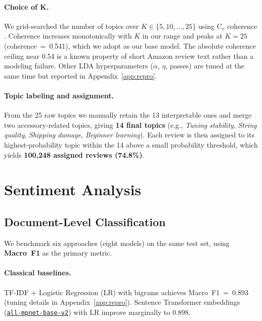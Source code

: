 \documentclass[11pt]{article}
\begin{document}
\paragraph{Choice of K.}
We grid-searched the number of topics over $K \in \{5, 10, \ldots, 25\}$
using C$_v$ coherence \cite{roder2015coherence}.
Coherence increases monotonically with $K$ in our range and peaks
at $K{=}25$ (coherence~=~0.541), which we adopt as our base model.
The absolute coherence ceiling near 0.54 is a known property of short
Amazon review text rather than a modeling failure.
Other LDA hyperparameters ($\alpha$, $\eta$, passes) are tuned at the
same time but reported in Appendix~\ref{app:repro}.

\paragraph{Topic labeling and assignment.}
From the 25 raw topics we manually retain the 13 interpretable ones
and merge two accessory-related topics, giving \textbf{14 final
topics} (e.g., \textit{Tuning stability}, \textit{String quality},
\textit{Shipping damage}, \textit{Beginner learning}).
Each review is then assigned to its highest-probability topic within
the 14 above a small probability threshold, which yields
\textbf{100{,}248 assigned reviews (74.8\%)}.

\section{Sentiment Analysis}
\label{sec:sentiment}

\subsection{Document-Level Classification}
\label{sec:doclevel}

We benchmark six approaches (eight models) on the same test set,
using \textbf{Macro~F1} as the primary metric.

\paragraph{Classical baselines.}
TF-IDF + Logistic Regression (LR) with bigrams achieves Macro~F1~=~0.893 (tuning details in Appendix~\ref{app:repro}).
Sentence Transformer embeddings
(\href{https://huggingface.co/sentence-transformers/all-mpnet-base-v2}{\texttt{all-mpnet-base-v2}})
\cite{reimers2019sbert} with LR improve marginally to 0.898.
\end{document}
